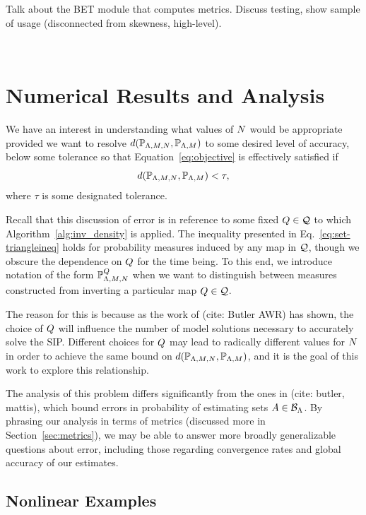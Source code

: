 Talk about the BET module that computes metrics.
Discuss testing, show sample of usage (disconnected from skewness, high-level).


\
\section{Numerical Results and Analysis}\label{sec:ch03-examples}


We have an interest in understanding what values of $N$ would be appropriate provided we want to resolve $d(\mathbb{P}_{{\Lambda}, M, N}, \mathbb{P}_{{\Lambda}, M})$ to some desired level of accuracy, below some tolerance so that Equation~\eqref{eq:objective} is effectively satisfied if
\begin{equation}\label{eq:newobjective}
d(\mathbb{P}_{{\Lambda}, M, N}, \mathbb{P}_{{\Lambda},M}) < \tau,
\end{equation}
where $\tau$ is some designated tolerance.

Recall that this discussion of error is in reference to some fixed $Q\in\mathcal{Q}$ to which Algorithm~\ref{alg:inv_density} is applied.
The inequality presented in Eq.~\eqref{eq:set-triangleineq} holds for probability measures induced by any map in $\mathcal{Q}$, though we obscure the dependence on $Q$ for the time being.
To this end, we introduce notation of the form $\mathbb{P}_{{\Lambda}, M, N}^{Q}$ when we want to distinguish between measures constructed from inverting a particular map $Q\in\mathcal{Q}$.

The reason for this is because as the work of (cite: Butler AWR) has shown, the choice of $Q$ will influence the number of model solutions necessary to accurately solve the SIP.
Different choices for $Q$ may lead to radically different values for $N$ in order to achieve the same bound on $d(\mathbb{P}_{{\Lambda}, M, N}, \mathbb{P}_{{\Lambda}, M})$, and it is the goal of this work to explore this relationship.

The analysis of this problem differs significantly from the ones in (cite: butler, mattis), which bound errors in probability of estimating sets $A\in\mathcal{B}_{{\Lambda}}$.
By phrasing our analysis in terms of metrics (discussed more in Section~\ref{sec:metrics}), we may be able to answer more broadly generalizable questions about error, including those regarding convergence rates and global accuracy of our estimates.


\subsection{Nonlinear Examples}

\FloatBarrier


\FloatBarrier
